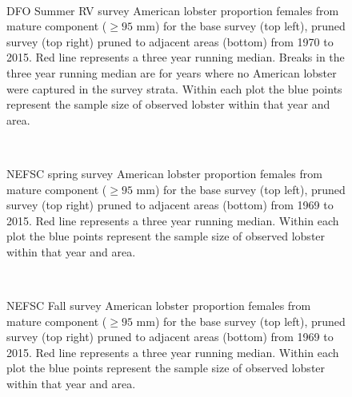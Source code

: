 \documentclass[11pt]{article}
\newcommand{\e}{/backup/bio_data/bio.lobster/figures/} %
\begin{document}
\begin{figure}
\centering
{}
\\
\caption{DFO Summer RV survey American lobster proportion females from mature component ($ \ge 95$ mm) for the base survey (top left), pruned survey (top right) pruned to adjacent areas (bottom) from 1970 to 2015. Red line represents a three year running median. Breaks in the three year running median are for years where no American lobster were captured in the survey strata. Within each plot the blue points represent the sample size of observed lobster within that year and area.}
\end{figure}
\clearpage


\begin{figure}
\centering
{}
\\
\caption{NEFSC spring survey American lobster proportion females from mature component ($ \ge 95$ mm) for the base survey (top left), pruned survey (top right) pruned to adjacent areas (bottom) from 1969 to 2015. Red line represents a three year running median. Within each plot the blue points represent the sample size of observed lobster within that year and area. }
\end{figure}
\clearpage



\begin{figure}
\centering
{}
\\
\caption{NEFSC Fall survey American lobster proportion females from mature component ($ \ge 95$ mm) for the base survey (top left), pruned survey (top right) pruned to adjacent areas (bottom) from 1969 to 2015. Red line represents a three year running median. Within each plot the blue points represent the sample size of observed lobster within that year and area. }
\end{figure}
\clearpage
\end{document}
